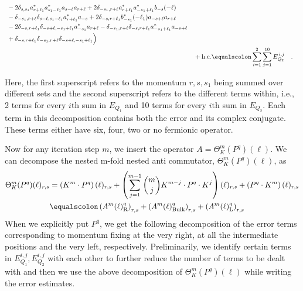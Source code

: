 \documentclass[sn-mathphys, Numbered ,a4paper]{sn-jnl}%
\theoremstyle{plain}
\theoremstyle{definition}
\theoremstyle{remark}
\theoremstyle{plain}
\theoremstyle{definition}
\theoremstyle{remark}
\begin{document}
{\begin{alignat}{2}
\begin{aligned}[t]
		&\;-2\delta_{s,s_1}a^*_{r+\ell_1} a^*_{s_1-\ell_1}a_{s-\ell} a_{r+\ell} + 2 \delta_{-s_1, r+\ell}a^*_{r+\ell_1}a^*_{-s_1+\ell_1}b_{-s}(-\ell)\nonumber\\
		&\;-\delta_{-s_1,r+\ell}\delta_{s-\ell,s_1-\ell_1}a^*_{r+\ell_1}a_{-s} + 2\delta_{-s,r+\ell_1}b^*_{-s_1}(-\ell_1)a_{-s+\ell}a_{r+\ell} \nonumber\\
		&\;-2\delta_{-s,r+\ell_1}\delta_{-s+\ell,-s_1+\ell_1}a^*_{-s_1}a_{r+\ell} - \delta_{-s_1,r+\ell}\delta_{-s,r+\ell_1}a^*_{-s_1+\ell_1}a_{-s+\ell}\nonumber\\
		&\;+ \delta_{-s,r+\ell_1} \delta_{-s_1,r+\ell} \delta_{-s+\ell,-s_1+\ell_1} \Big)  
	\end{aligned}\\
	&\quad +\mathrm{h.c.} \equalscolon \sum\limits_{i=1}^{2}\sum\limits_{j=1}^{10} E_{Q_2}^{\,i,j}\nonumber\quad.
\end{alignat}}



Here, the first superscript refers to the momentum $r,s,s_1$ being summed over different sets and the second superscript refers to the different terms within, i.e., 2 terms for every $i\mathrm{th}$ sum in $E_{Q_1}$ and 10 terms for every $i\mathrm{th}$ sum in $E_{Q_2}$. Each term in this decomposition contains both the error and its complex conjugate. These terms either have six, four, two or no fermionic operator.

Now for any iteration step $m$, we insert the operator $A= \Theta^m_K(P^q)(\ell)$. We can decompose the nested m-fold nested anti commutator, $\Theta^m_K(P^q)(\ell)$,  as
\begin{align}
	\Theta^m_K(P^q)(\ell)_{r,s} &= \left(K^m\cdot P^q\right)(\ell )_{r,s} +\left(\sum\limits_{j=1}^{m-1} {{m}\choose j}K^{m-j}\cdot P^q\cdot K^{j}\right)(\ell)_{r,s} + \left(P^q\cdot K^m\right)(\ell)_{r,s}\\ 
	&\equalscolon \left(A^m(\ell)^q_\mathrm{R}\right)_{r,s} +\left(A^m(\ell)^q_\mathrm{Bulk}\right)_{r,s}+\left(A^m(\ell)^q_\mathrm{L}\right)_{r,s}
\end{align}
When we explicitly put $P^q$, we get the following decomposition of the error terms corresponding to momentum fixing at the very right, at all the intermediate positions and the very left, respectively. Preliminarily, we identify certain terms in $E_{Q_1}^{i,j}, E_{Q_2}^{i,j}$ with each other to further reduce the number of terms to be dealt with and then we use the above decomposition of $\Theta^m_K(P^q)(\ell)$ while writing the error estimates.
\end{document}

